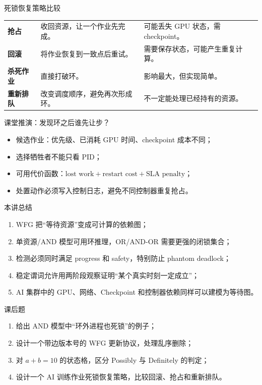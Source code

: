 \documentclass[UTF8,fontset=none,aspectratio=169,10pt]{beamer}
\begin{document}
\begin{frame}{死锁恢复策略比较}
\begin{tabularx}{\linewidth}{>{\bfseries}p{2.8cm}XX}
\toprule
抢占 & 收回资源，让一个作业先完成。 & 可能丢失 GPU 状态，需 checkpoint。 \\
回滚 & 将作业恢复到一致点后重试。 & 需要保存状态，可能产生重复计算。 \\
杀死作业 & 直接打破环。 & 影响最大，但实现简单。 \\
重新排队 & 改变调度顺序，避免再次形成环。 & 不一定能处理已经持有的资源。 \\
\bottomrule
\end{tabularx}
\end{frame}

\begin{frame}{课堂推演：发现环之后谁先让步？}
\begin{itemize}
  \item 候选作业：优先级、已消耗 GPU 时间、checkpoint 成本不同；
  \item 选择牺牲者不能只看 PID；
  \item 可用代价函数：\(\text{lost work}+\text{restart cost}+\text{SLA penalty}\)；
  \item 处置动作必须写入控制日志，避免不同控制器重复抢占。
\end{itemize}
\end{frame}

\begin{frame}{本讲总结}
\begin{enumerate}
  \item WFG 把“等待资源”变成可计算的依赖图；
  \item 单资源/AND 模型可用环推理，OR/AND-OR 需要更强的闭锁集合；
  \item 检测必须同时满足 progress 和 safety，特别防止 phantom deadlock；
  \item 稳定谓词允许用两阶段观察证明“某个真实时刻一定成立”；
  \item AI 集群中的 GPU、网络、Checkpoint 和控制器依赖同样可以建模为等待图。
\end{enumerate}
\vfill
{}
\end{frame}

\begin{frame}{课后题}
\begin{enumerate}
  \item 给出 AND 模型中“环外进程也死锁”的例子；
  \item 设计一个带边版本号的 WFG 更新协议，处理乱序删除；
  \item 对 $a+b=10$ 的状态格，区分 Possibly 与 Definitely 的判定；
  \item 设计一个 AI 训练作业死锁恢复策略，比较回滚、抢占和重新排队。
\end{enumerate}
\end{frame}
\end{document}
